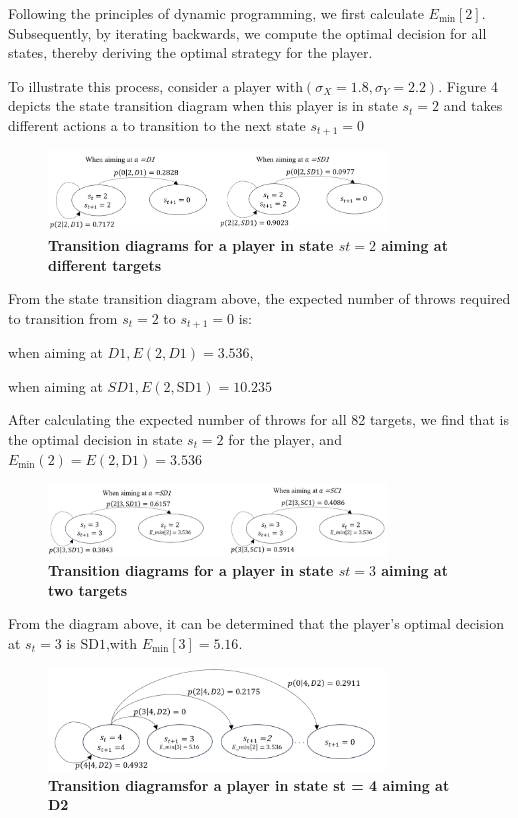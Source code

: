 \documentclass[cjjs]{ipart}
\theoremstyle{plain}
\begin{document}
Following the principles of dynamic programming, we first calculate $E_{\min}[2]$. Subsequently, by iterating backwards, we compute the optimal decision for all states, thereby deriving the optimal strategy for the player.

To illustrate this process, consider a player with$(\sigma_X = 1.8, \sigma_Y = 2.2)$. Figure 4 depicts the state transition diagram when this player is in state $s_t = 2$ and takes different actions a to transition to the next state $s_{t+1} = 0$

\begin{figure}[h]
    \centering
    \includegraphics[width=0.80\textwidth]{6.png} 
    \caption{\textbf{Transition diagrams
for a player in state $st = 2$ aiming at different targets}}
    \label{fig:dartboard}
\end{figure}

From the state transition diagram above, the expected number of throws required to transition from $s_t = 2$ to $s_{t+1} =0$ is:

when aiming at $D1,E(2, D1) = 3.536$,

when aiming at $SD1,E(2, \text{SD1}) = 10.235$

After calculating the expected number of throws for all 82 targets, we find that is the optimal decision in state $s_t = 2$ for the player, and $E_{\min}(2) = E(2, \text{D1}) = 3.536$

\begin{figure}[h]
    \centering
    \includegraphics[width=0.80\textwidth]{7.png} 
    \caption{\textbf{Transition diagrams
for a player in state $st = 3$ aiming at two targets}}
    \label{fig:dartboard}
\end{figure}

From the diagram above, it can be determined that the player's optimal decision at $s_t = 3$ is $\text{SD1}$,with $E_{\min}[3] = 5.16$.

\begin{figure}[h]
    \centering
    \includegraphics[width=0.80\textwidth]{8.png} 
    \caption{\textbf{Transition diagramsfor a player in state st = 4 aiming at D2}}
    \label{fig:dartboard}
\end{figure}
\end{document}
